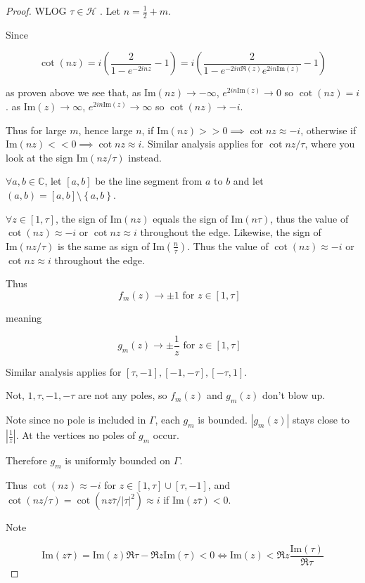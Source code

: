 \documentclass{article}
\newcommand*{\HC}{\mathcal{H}}
\newcommand{\C}{\mathbb{C}}
\newcommand{\abs}[1]{\left\lvert #1\right\rvert}
\newcommand{\IM}[1]{\text{Im}(#1)}
\begin{document}
\begin{proof}
    WLOG $\tau \in \HC$ .   
    Let $n = \frac{1}{2} + m$. 
    
    Since

    \[\cot(nz) = i\left(\frac{2}{1 - e^{-2inz}} - 1\right) = i\left(\frac{2}{1 - e^{-2in\Re(z)}e^{2 i n \IM{z}}} - 1\right)\]

    as proven above we see that, as $\IM{nz} \to -\infty$, $e^{2 i n \IM{z}} \to 0$ so $\cot(nz) = i$. as $\IM{z} \to \infty$, $e^{2 i n \IM{z}} \to \infty$ so $\cot(nz) \to -i$. 
    
    Thus for large $m$, hence large $n$, if $\IM{nz} >> 0 \implies \cot{nz} \approx -i$, otherwise if $\IM{nz} << 0 \implies \cot{nz} \approx i$. Similar analysis applies for $\cot{nz / \tau}$, where you look at the sign $\IM{nz / \tau}$ instead.
    
    $\forall a, b \in \C$, let $[a, b]$ be the line segment from $a$ to $b$ and let $(a, b) = [a, b] \setminus \left\{ a, b \right\}$. 

    $\forall z \in [1, \tau]$, the sign of $\IM{nz}$ equals the sign of $\IM{n \tau}$, thus the value of $\cot(nz) \approx -i$ or $\cot{nz} \approx i$ throughout the edge. Likewise, the sign of $\IM{nz / \tau}$ is the same as sign of $\IM{\frac{n}{\tau}}$. Thus the value of $\cot(nz) \approx -i$ or $\cot{nz} \approx i$ throughout the edge. 
    
    Thus \[f_m(z) \to \pm 1 \text{ for $z \in [1, \tau]$ }\] 

    meaning 

    \[g_m(z) \to \pm \frac{1}{z} \text{ for $z \in [1, \tau]$ }\]
    
    Similar analysis applies for $[\tau, -1], [-1, -\tau], [-\tau, 1]$.

    Not, $1, \tau, -1, -\tau$ are not any poles, so $f_m(z)$ and $g_m(z)$ don't blow up.    
    
    Note since no pole is included in $\Gamma$, each $g_m$ is bounded. $\abs{g_m(z)}$ stays close to $\abs{\frac{1}{z}}$. At the vertices no poles of $g_m$ occur.
    
    Therefore $g_m$ is uniformly bounded on $\Gamma$.
    
    Thus $\cot(nz) \approx -i$ for $z \in [1, \tau] \cup [\tau, -1]$, and $\cot(nz / \tau) = \cot(n z \overline{\tau} / \abs{\tau}^2) \approx i$ if $\IM{z \overline{\tau}} < 0$. 
    
    Note 

    \[        \IM{z \overline{\tau}} = \IM{z} \Re{\tau} - \Re{z} \IM{\tau} < 0 \iff \IM{z} < \Re{z}\frac{\IM{\tau}}{\Re{\tau}} 
\]


\end{proof}
\end{document}
